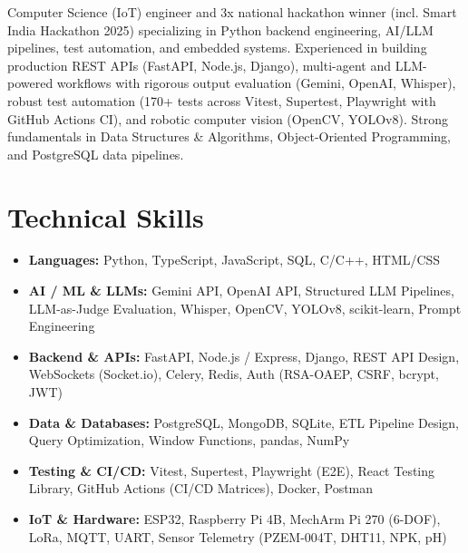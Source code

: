 \documentclass[11pt,a4paper,sans]{moderncv}
\begin{document}
\makecvtitle
\vspace{-16pt}

\small{Computer Science (IoT) engineer and 3x national hackathon winner (incl. Smart India Hackathon 2025) specializing in Python backend engineering, AI/LLM pipelines, test automation, and embedded systems. Experienced in building production REST APIs (FastAPI, Node.js, Django), multi-agent and LLM-powered workflows with rigorous output evaluation (Gemini, OpenAI, Whisper), robust test automation (170+ tests across Vitest, Supertest, Playwright with GitHub Actions CI), and robotic computer vision (OpenCV, YOLOv8). Strong fundamentals in Data Structures \& Algorithms, Object-Oriented Programming, and PostgreSQL data pipelines.}

\section{Technical Skills}
\vspace{1pt}
\begin{itemize}
\item \textbf{Languages:} Python, TypeScript, JavaScript, SQL, C/C++, HTML/CSS
\item \textbf{AI / ML \& LLMs:} Gemini API, OpenAI API, Structured LLM Pipelines, LLM-as-Judge Evaluation, Whisper, OpenCV, YOLOv8, scikit-learn, Prompt Engineering
\item \textbf{Backend \& APIs:} FastAPI, Node.js / Express, Django, REST API Design, WebSockets (Socket.io), Celery, Redis, Auth (RSA-OAEP, CSRF, bcrypt, JWT)
\item \textbf{Data \& Databases:} PostgreSQL, MongoDB, SQLite, ETL Pipeline Design, Query Optimization, Window Functions, pandas, NumPy
\item \textbf{Testing \& CI/CD:} Vitest, Supertest, Playwright (E2E), React Testing Library, GitHub Actions (CI/CD Matrices), Docker, Postman
\item \textbf{IoT \& Hardware:} ESP32, Raspberry Pi 4B, MechArm Pi 270 (6-DOF), LoRa, MQTT, UART, Sensor Telemetry (PZEM-004T, DHT11, NPK, pH)
\end{itemize}

\end{document}
